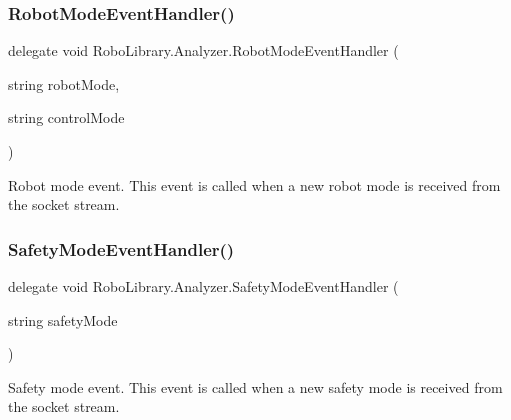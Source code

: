 \hypertarget{class_robo_library_1_1_analyzer_aa1d0cf635115d275b8488aab662610fa}{}\label{class_robo_library_1_1_analyzer_aa1d0cf635115d275b8488aab662610fa} 
\subsubsection{\texorpdfstring{Robot\+Mode\+Event\+Handler()}{RobotModeEventHandler()}}
{\footnotesize\ttfamily delegate void Robo\+Library.\+Analyzer.\+Robot\+Mode\+Event\+Handler (\begin{DoxyParamCaption}\item[{string}]{robot\+Mode,  }\item[{string}]{control\+Mode }\end{DoxyParamCaption})}



Robot mode event. This event is called when a new robot mode is received from the socket stream.

\hypertarget{class_robo_library_1_1_analyzer_ae03a29ceaec0141398e05cba9cbfba4d}{}\label{class_robo_library_1_1_analyzer_ae03a29ceaec0141398e05cba9cbfba4d} 
\subsubsection{\texorpdfstring{Safety\+Mode\+Event\+Handler()}{SafetyModeEventHandler()}}
{\footnotesize\ttfamily delegate void Robo\+Library.\+Analyzer.\+Safety\+Mode\+Event\+Handler (\begin{DoxyParamCaption}\item[{string}]{safety\+Mode }\end{DoxyParamCaption})}



Safety mode event. This event is called when a new safety mode is received from the socket stream.

\hypertarget{class_robo_library_1_1_analyzer_a6d2960ef27111be171f8c9d6a7d2a058}{}\label{class_robo_library_1_1_analyzer_a6d2960ef27111be171f8c9d6a7d2a058} 

